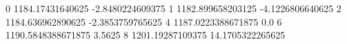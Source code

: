 0 1184.17431640625 -2.8480224609375
1 1182.899658203125 -4.1226806640625
2 1184.636962890625 -2.3853759765625
4 1187.0223388671875 0.0
6 1190.5848388671875 3.5625
8 1201.19287109375 14.1705322265625
